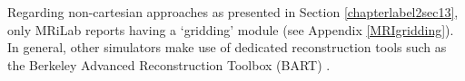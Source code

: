 \hfill

Regarding non-cartesian approaches as presented in Section \ref{chapterlabel2sec13}, only MRiLab \cite{Liu2017} reports having a `gridding' module (see Appendix \ref{MRIgridding}).
In general, other simulators make use of dedicated reconstruction tools such as the Berkeley Advanced Reconstruction Toolbox (BART) \cite{Lustig2016}.
